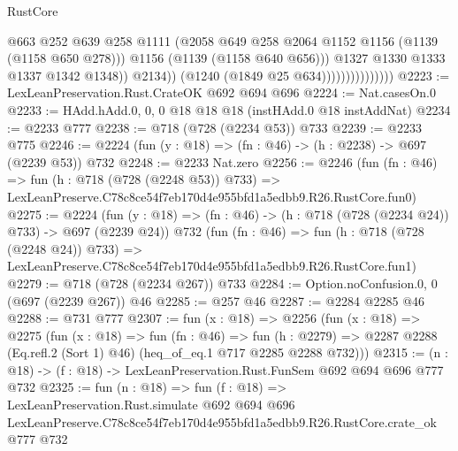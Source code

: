 \begin{lexlean}{RustCore}
\begin{coremodule}
                                        @663
                                        @252
                                        @639
                                        @258
                                        @1111
                                        (@2058
                                          @649
                                          @258
                                          @2064
                                          @1152
                                          @1156
                                          (@1139 (@1158 @650 @278)))
                                        @1156
                                        (@1139 (@1158 @640 @656)))
                                      @1327
                                      @1330
                                      @1333
                                      @1337
                                      @1342
                                      @1348))
                                  @2134))
                              (@1240 (@1849 @25 @634)))))))))))))))
@2223 := LexLeanPreservation.Rust.CrateOK @692 @694 @696
@2224 := Nat.casesOn.{0}
@2233 := HAdd.hAdd.{0, 0, 0} @18 @18 @18 (instHAdd.{0} @18 instAddNat)
@2234 := @2233 @777
@2238 := @718 (@728 (@2234 @53)) @733
@2239 := @2233 @775
@2246 := @2224 (fun (y : @18) => (fn : @46) -> (h : @2238) -> @697 (@2239 @53)) @732
@2248 := @2233 Nat.zero
@2256 := @2246
    (fun (fn : @46) =>
    fun (h : @718 (@728 (@2248 @53)) @733) =>
    LexLeanPreserve.C78c8ce54f7eb170d4e955bfd1a5edbb9.R26.RustCore.fun0)
@2275 := @2224
    (fun (y : @18) => (fn : @46) -> (h : @718 (@728 (@2234 @24)) @733) -> @697 (@2239 @24))
    @732
    (fun (fn : @46) =>
    fun (h : @718 (@728 (@2248 @24)) @733) =>
    LexLeanPreserve.C78c8ce54f7eb170d4e955bfd1a5edbb9.R26.RustCore.fun1)
@2279 := @718 (@728 (@2234 @267)) @733
@2284 := Option.noConfusion.{0, 0} (@697 (@2239 @267)) @46
@2285 := @257 @46
@2287 := @2284 @2285 @46
@2288 := @731 @777
@2307 := fun (x : @18) =>
  @2256
    (fun (x : @18) =>
    @2275
      (fun (x : @18) =>
      fun (fn : @46) =>
      fun (h : @2279) =>
      @2287 @2288 (Eq.refl.{2} (Sort 1) @46) (heq_of_eq.{1} @717 @2285 @2288 @732)))
@2315 := (n : @18) -> (f : @18) -> LexLeanPreservation.Rust.FunSem @692 @694 @696 @777 @732
@2325 := fun (n : @18) =>
  fun (f : @18) =>
  LexLeanPreservation.Rust.simulate
    @692
    @694
    @696
    LexLeanPreserve.C78c8ce54f7eb170d4e955bfd1a5edbb9.R26.RustCore.crate_ok
    @777
    @732
\end{coremodule}
\end{lexlean}
